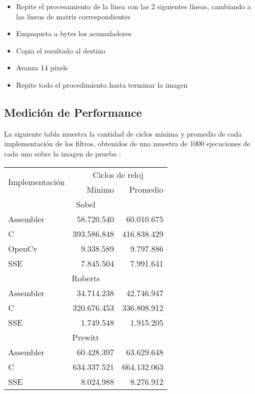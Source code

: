 \begin{itemize}
\item Repite el procesamiento de la l\'inea con las 2 siguientes l\'ineas, cambiando a las l\'ineas de matr\'iz correspondientes

\item Empaqueta a bytes los acumuladores

\item Copia el resultado al destino

\item Avanza 14 p\'ixels

\item Repite todo el procedimiento hasta terminar la imagen

\end{itemize}


\subsection{Medici\'on de Performance}

La siguiente tabla muestra la cantidad de ciclos m\'inima y promedio de cada implementaci\'on de los filtros, obtenidos de una muestra de
1000 ejecuciones de cada uno sobre la imagen de prueba :
\begin{center}
\begin{tabular}{|l|r|r|}
\hline
\multirow{2}{*}{Implementaci\'on}&\multicolumn{2}{|c|}{Ciclos de reloj} \\
\cline{2-3}
&M\'inimo	&	Promedio \\
\hline
\multicolumn{3}{|c|}{Sobel}\\
\hline
Assembler	&	58.720.540	&	60.010.675 \\
\hline
C		&	393.586.848	&	416.838.429 \\
\hline
OpenCv		&	9.338.589	& 	9.797.886 \\
\hline
SSE		&	7.845.504 	&	7.991.641 \\
\hline
\multicolumn{3}{|c|}{Roberts}\\
\hline
Assembler	&	34.714.238	&	42.746.947 \\
\hline
C		&	320.676.453	&	336.808.912 \\
\hline
SSE		&	1.749.548	&	1.915.205 \\
\hline
\multicolumn{3}{|c|}{Prewitt}\\
\hline
Assembler	&	60.428.397	&	63.629.648 \\
\hline
C		&	634.337.521	&	664.132.063 \\
\hline
SSE		&	8.024.988		&	8.276.912 \\
\hline

\end{tabular}
\end{center}



\pagebreak
